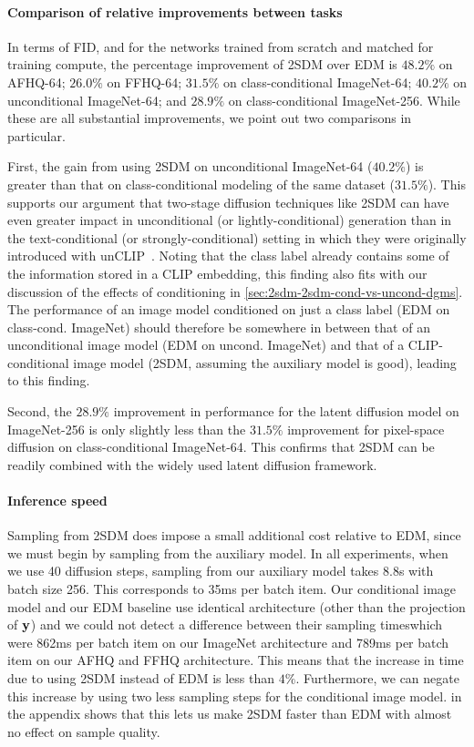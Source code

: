 \paragraph{Comparison of relative improvements between tasks}
In terms of FID, and for the networks trained from scratch and matched for training compute, the percentage improvement of 2SDM over EDM is $48.2\%$ on AFHQ-64; $26.0\%$ on FFHQ-64; $31.5\%$ on class-conditional ImageNet-64; $40.2\%$ on unconditional ImageNet-64; and $28.9\%$ on class-conditional ImageNet-256. While these are all substantial improvements, we point out two comparisons in particular. 

First, the gain from using 2SDM on unconditional ImageNet-64 ($40.2\%$) is greater than that on class-conditional modeling of the same dataset ($31.5\%$). This supports our argument that two-stage diffusion techniques like 2SDM can have even greater impact in unconditional (or lightly-conditional) generation than in the text-conditional (or strongly-conditional) setting in which they were originally introduced with unCLIP~\citep{ramesh2022hierarchical}.  Noting that the class label already contains some of the information stored in a CLIP embedding, this finding also fits with our discussion of the effects of conditioning in \cref{sec:2sdm-2sdm-cond-vs-uncond-dgms}. The performance of an image model conditioned on just a class label (EDM on class-cond. ImageNet) should therefore be somewhere in between that of an unconditional image model (EDM on uncond. ImageNet) and that of a CLIP-conditional image model (2SDM, assuming the auxiliary model is good), leading to this finding.

Second, the $28.9\%$ improvement in performance for the latent diffusion model on ImageNet-256 is only slightly less than the $31.5\%$ improvement for pixel-space diffusion on class-conditional ImageNet-64. This confirms that 2SDM can be readily combined with the widely used latent diffusion framework.

\paragraph{Inference speed}
Sampling from 2SDM does impose a small additional cost relative to EDM, since we must begin by sampling from the auxiliary model. In all experiments, when we use 40 diffusion steps, sampling from our auxiliary model takes 8.8s with batch size 256. This corresponds to 35ms per batch item. Our conditional image model and our EDM baseline use identical architecture (other than the projection of ${\mathbf{y}}$) and we could not detect a difference between their sampling timeswhich were 862ms per batch item on our ImageNet architecture and 789ms per batch item on our AFHQ and FFHQ architecture. This means that the increase in time due to using 2SDM instead of EDM is less than $4\%$. Furthermore, we can negate this increase by using two less sampling steps for the conditional image model.  in the appendix shows that this lets us make 2SDM faster than EDM with almost no effect on sample quality.


